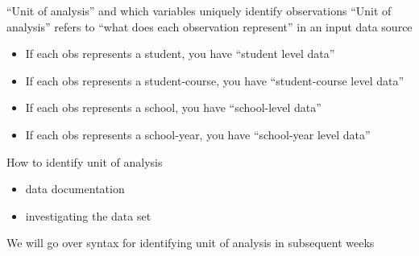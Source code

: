 \documentclass[
  8pt,
  ignorenonframetext,
  dvipsnames]{beamer}
\providecommand{\tightlist}{%
  \setlength{\itemsep}{0pt}\setlength{\parskip}{0pt}}
\let\olditem\item
\renewcommand{\item}{%
  \olditem\vspace{4pt}
}
\begin{document}
\begin{frame}{``Unit of analysis'' and which variables uniquely identify
observations}
\protect\hypertarget{unit-of-analysis-and-which-variables-uniquely-identify-observations}{}
``Unit of analysis'' refers to ``what does each observation represent''
in an input data source

\begin{itemize}
\tightlist
\item
  If each obs represents a student, you have ``student level data''
\item
  If each obs represents a student-course, you have ``student-course
  level data''
\item
  If each obs represents a school, you have ``school-level data''
\item
  If each obs represents a school-year, you have ``school-year level
  data''
\end{itemize}

How to identify unit of analysis

\begin{itemize}
\tightlist
\item
  data documentation
\item
  investigating the data set
\end{itemize}

We will go over syntax for identifying unit of analysis in subsequent
weeks
\end{frame}
\end{document}
